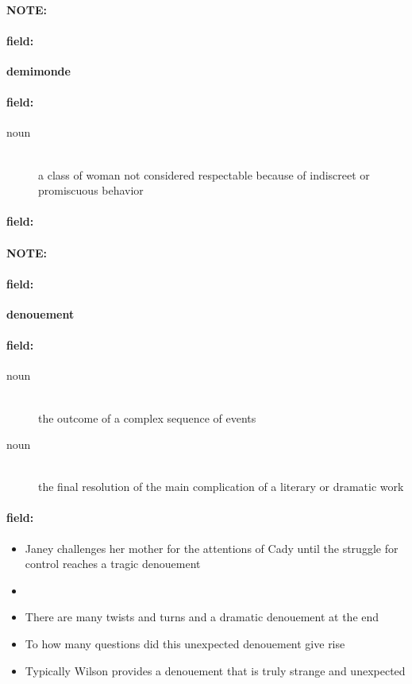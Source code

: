 \documentclass[12pt]{article}
\newenvironment{note}{\paragraph{NOTE:}}{}
\newenvironment{field}{\paragraph{field:}}{}
\begin{document}
\begin{note}
\begin{field}
\textbf{\large demimonde}
\end{field}


\begin{field}
\begin{description}
\item[noun] \hfill \\ 
a class of woman not considered respectable because of indiscreet or promiscuous behavior

\end{description}
\end{field}

\begin{field}
\end{field}
\end{note}
\begin{note}
\begin{field}
\textbf{\large denouement}
\end{field}


\begin{field}
\begin{description}
\item[noun] \hfill \\ 
the outcome of a complex sequence of events

\item[noun] \hfill \\ 
the final resolution of the main complication of a literary or dramatic work

\end{description}
\end{field}

\begin{field}
\begin{itemize}
\item Janey challenges her mother for the attentions of Cady until the struggle for control reaches a tragic denouement
\item 
\item There are many twists and turns and a dramatic denouement at the end
\item To how many questions did this unexpected denouement give rise
\item Typically Wilson provides a denouement that is truly strange and unexpected
\end{itemize}
\end{field}
\end{note}
\end{document}
